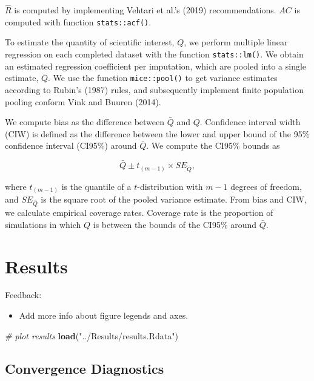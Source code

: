 \documentclass[
  Royal, times, sageapa]{sagej}
\newenvironment{Shaded}{\begin{snugshade}}{\end{snugshade}}
\newcommand{\CommentTok}[1]{\textcolor[rgb]{0.56,0.35,0.01}{\textit{#1}}}
\newcommand{\KeywordTok}[1]{\textcolor[rgb]{0.13,0.29,0.53}{\textbf{#1}}}
\newcommand{\NormalTok}[1]{#1}
\newcommand{\StringTok}[1]{\textcolor[rgb]{0.31,0.60,0.02}{#1}}
\providecommand{\tightlist}{%
  \setlength{\itemsep}{0pt}\setlength{\parskip}{0pt}}
\begin{document}
\(\widehat{R}\) is computed by implementing Vehtari et al.'s (2019)
recommendations. \(AC\) is computed with function \texttt{stats::acf()}.

To estimate the quantity of scientific interest, \(Q\), we perform
multiple linear regression on each completed dataset with the function
\texttt{stats::lm()}. We obtain an estimated regression coefficient per
imputation, which are pooled into a single estimate, \(\bar{Q}\). We use
the function \texttt{mice::pool()} to get variance estimates according
to Rubin's (1987) rules, and subsequently implement finite population
pooling conform Vink and Buuren (2014).

We compute bias as the difference between \(\bar{Q}\) and \(Q\).
Confidence interval width (CIW) is defined as the difference between the
lower and upper bound of the 95\% confidence interval (CI95\%) around
\(\bar{Q}\). We compute the CI95\% bounds as

\[\bar{Q} \pm t_{(m-1)} \times SE_{\bar{Q}},\]

where \(t_{(m-1)}\) is the quantile of a \(t\)-distribution with \(m-1\)
degrees of freedom, and \(SE_{\bar{Q}}\) is the square root of the
pooled variance estimate. From bias and CIW, we calculate empirical
coverage rates. Coverage rate is the proportion of simulations in which
\(Q\) is between the bounds of the CI95\% around \(\bar{Q}\).

\hypertarget{results}{%
\section{Results}\label{results}}

Feedback:

\begin{itemize}
\tightlist
\item
  Add more info about figure legends and axes.
\end{itemize}

\begin{Shaded}
\begin{Highlighting}[]
\CommentTok{# plot results}
\KeywordTok{load}\NormalTok{(}\StringTok{"../Results/results.Rdata"}\NormalTok{)}
\end{Highlighting}
\end{Shaded}

\hypertarget{convergence-diagnostics-1}{%
\subsection{Convergence Diagnostics}\label{convergence-diagnostics-1}}
\end{document}

